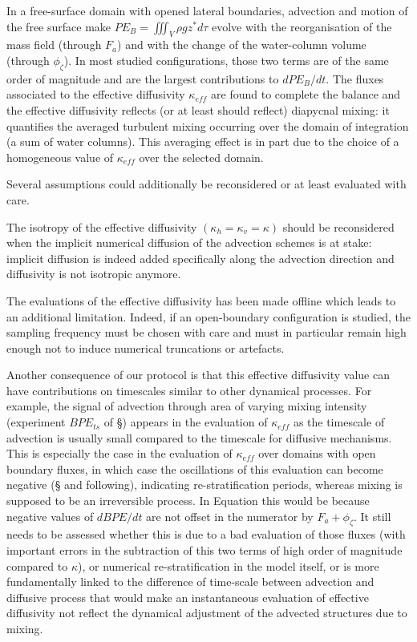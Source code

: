 In a free-surface domain with opened lateral boundaries, advection and motion of the free surface make $PE_B=\iiint_V \rho g z^* d\tau$ evolve with the reorganisation of the mass field (through $F_a$) and with the change of the water-column volume (through $\phi_{\zeta}$). In most studied configurations, those two terms are of the same order of magnitude and are the largest contributions to $dPE_B/dt$. The fluxes associated to the effective diffusivity $\kappa_{eff}$ are found to complete the balance and the effective diffusivity reflects (or at least should reflect) diapycnal mixing: it quantifies the averaged turbulent mixing occurring over the domain of integration (a sum of water columns). 
This averaging effect is in part due to the choice of a homogeneous value of $\kappa_{eff}$ over the selected domain. 

Several assumptions could additionally be reconsidered or at least evaluated with care.

The isotropy of the effective diffusivity $(\kappa_h=\kappa_v=\kappa)$ should be reconsidered when the implicit numerical diffusion of the advection schemes is at stake: implicit diffusion is indeed added specifically along the advection direction and diffusivity is not isotropic anymore.

The evaluations of the effective diffusivity has been made offline which leads to an additional limitation. Indeed, if an open-boundary configuration is studied, the sampling frequency must be chosen with care and must in particular remain high enough not to induce numerical truncations or artefacts.


\color{red}Another consequence of our protocol is that this effective diffusivity value can have contributions on timescales similar to other dynamical processes. For example, the signal of advection through area of varying mixing intensity (experiment $BPE_{ts}$ of \S {}) appears in the evaluation of $\kappa_{eff}$ as the timescale of advection is usually small compared to the timescale for diffusive mechanisms. This is especially the case in the evaluation of $\kappa_{eff}$ over domains with open boundary fluxes, in which case the oscillations of this evaluation can become negative (\S {} and following), indicating re-stratification periods, whereas mixing is supposed to be an irreversible process. 
In Equation  this would be because negative values of $dBPE/dt$ are not offset in the numerator by $F_a+\phi_{\zeta}$. It still needs to be assessed whether this is due to a bad evaluation of those fluxes (with important errors in the subtraction of this two terms of high order of magnitude compared to $\kappa$), or numerical re-stratification in the model itself, or is more fundamentally linked to the difference of time-scale between advection and diffusive process that would make an instantaneous evaluation of effective diffusivity not reflect the dynamical adjustment of the advected structures due to mixing.\color{black}


